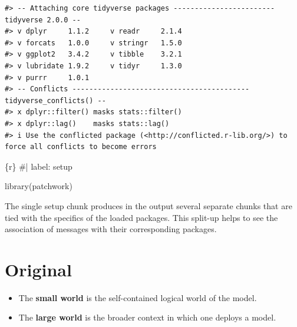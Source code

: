\documentclass[
  letterpaper,
  DIV=11,
  numbers=noendperiod]{scrreprt}
\newenvironment{Shaded}{\begin{snugshade}}{\end{snugshade}}
\newcommand{\CommentTok}[1]{\textcolor[rgb]{0.37,0.37,0.37}{#1}}
\newcommand{\FunctionTok}[1]{\textcolor[rgb]{0.28,0.35,0.67}{#1}}
\newcommand{\InformationTok}[1]{\textcolor[rgb]{0.37,0.37,0.37}{#1}}
\newcommand{\NormalTok}[1]{\textcolor[rgb]{0.00,0.23,0.31}{#1}}
\providecommand{\tightlist}{%
  \setlength{\itemsep}{0pt}\setlength{\parskip}{0pt}}\usepackage{longtable,booktabs,array}
\begin{document}
\begin{verbatim}
#> -- Attaching core tidyverse packages ------------------------ tidyverse 2.0.0 --
#> v dplyr     1.1.2     v readr     2.1.4
#> v forcats   1.0.0     v stringr   1.5.0
#> v ggplot2   3.4.2     v tibble    3.2.1
#> v lubridate 1.9.2     v tidyr     1.3.0
#> v purrr     1.0.1     
#> -- Conflicts ------------------------------------------ tidyverse_conflicts() --
#> x dplyr::filter() masks stats::filter()
#> x dplyr::lag()    masks stats::lag()
#> i Use the conflicted package (<http://conflicted.r-lib.org/>) to force all conflicts to become errors
\end{verbatim}

\begin{Shaded}
\begin{Highlighting}[]
\InformationTok{\textasciigrave{}\textasciigrave{}\textasciigrave{}\{r\}}
\CommentTok{\#| label: setup}

\FunctionTok{library}\NormalTok{(patchwork)}

\InformationTok{\textasciigrave{}\textasciigrave{}\textasciigrave{}}
\end{Highlighting}
\end{Shaded}

\begin{tcolorbox}[enhanced jigsaw, colframe=quarto-callout-note-color-frame, colback=white, toprule=.15mm, breakable, arc=.35mm, bottomtitle=1mm, colbacktitle=quarto-callout-note-color!10!white, toptitle=1mm, titlerule=0mm, title=\textcolor{quarto-callout-note-color}{\faInfo}\hspace{0.5em}{Setup chunk results in several output chunks}, leftrule=.75mm, opacityback=0, rightrule=.15mm, opacitybacktitle=0.6, bottomrule=.15mm, left=2mm, coltitle=black]

The single setup chunk produces in the output several separate chunks
that are tied with the specifics of the loaded packages. This split-up
helps to see the association of messages with their corresponding
packages.

\end{tcolorbox}

\hypertarget{original}{%
\section*{Original}\label{original}}


\begin{itemize}
\tightlist
\item
  The \textbf{small world} is the self-contained logical world of the
  model.
\item
  The \textbf{large world} is the broader context in which one deploys a
  model.
\end{itemize}
\end{document}
